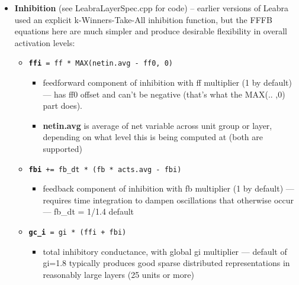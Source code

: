 \begin{itemize}
\tightlist
\item
  \textbf{Inhibition} (see LeabraLayerSpec.cpp for code) -- earlier versions of Leabra used an explicit k-Winners-Take-All inhibition function, but the FFFB equations here are much simpler and produce desirable flexibility in overall activation levels:

  \begin{itemize}
  \tightlist
  \item
    \textbf{\texttt{ffi}}\texttt{\ =\ ff\ *\ MAX(netin.avg\ -\ ff0,\ 0)}

    \begin{itemize}
    \tightlist
    \item
      feedforward component of inhibition with ff multiplier (1 by
      default) --- has ff0 offset and can't be negative (that's what
      the MAX(.. ,0) part does).
    \item
      \textbf{netin.avg} is average of net variable across unit group or
      layer, depending on what level this is being computed at (both are
      supported)
    \end{itemize}
  \item
    \textbf{\texttt{fbi}}\texttt{\ +=\ fb\_dt\ *\ (fb\ *\ acts.avg\ -\ fbi)}

    \begin{itemize}
    \tightlist
    \item
      feedback component of inhibition with fb multiplier (1 by default)
      --- requires time integration to dampen oscillations that
      otherwise occur --- fb\_dt = 1/1.4 default
    \end{itemize}
  \item
    \textbf{\texttt{gc\_i}}\texttt{\ =\ gi\ *\ (ffi\ +\ fbi)}

    \begin{itemize}
    \tightlist
    \item
      total inhibitory conductance, with global gi multiplier ---
      default of gi=1.8 typically produces good sparse distributed
      representations in reasonably large layers (25 units or more)
    \end{itemize}
  \end{itemize}
\end{itemize}

